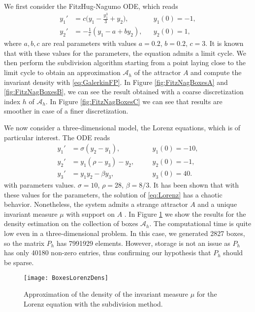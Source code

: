\documentclass{siamart1116}
\numberwithin{theorem}{section}
\begin{document}
We first consider the FitzHug-Nagumo ODE, which reads
\begin{equation}\label{eq:FitzNag}
\begin{aligned}
	y_1' &= c\Big(y_1 - \frac{y_1^3}{3} + y_2\Big), && y_1(0) = -1, \\
	y_2' &= -\frac{1}{c}(y_1 - a + by_2), && y_2(0) = 1,
\end{aligned}
\end{equation}
where $a, b, c$ are real parameters with values $a = 0.2$, $b = 0.2$, $c = 3$. It is known that with these values for the parameters, the equation admits a limit cycle. We then perform the subdivision algorithm starting from a point laying close to the limit cycle to obtain an approximation $\mathcal{A}_h$ of the attractor $A$ and compute the invariant density with \eqref{eq:GalerkinFP}. In Figure \ref{fig:FitzNagBoxesA} and \ref{fig:FitzNagBoxesB}, we can see the result obtained with a coarse discretization index $h$ of $\mathcal{A}_h$. In Figure \ref{fig:FitzNagBoxesC} we can see that results are smoother in case of a finer discretization. 

We now consider a three-dimensional model, the Lorenz equations, which is of particular interest. The ODE reads
\begin{equation}\label{eq:Lorenz}
\begin{aligned}
	y_1' &= \sigma(y_2 - y_1), \quad &&y_1(0) = -10,\\
	y_2' &= y_1(\rho - y_3) - y_2, \quad &&y_2(0) = -1,\\
	y_3' &= y_1y_2 - \beta y_3, \quad &&y_3(0) = 40.
\end{aligned}
\end{equation}
with parameters values. $\sigma = 10$, $\rho = 28$, $\beta = 8/3$. It has been shown \cite{LOR63} that with these values for the parameters, the solution of \eqref{eq:Lorenz} has a chaotic behavior. Nonetheless, the system admits a strange attractor $A$ and a unique invariant measure $\mu$ with support on $A$ \cite{Tuc99, HoM07}. In Figure \ref{fig:LorenzBoxes} we show the results for the density estimation on the collection of boxes $\mathcal{A}_h$. The computational time is quite low even in a three-dimensional problem. In this case, we generated 2827 boxes, so the matrix $P_h$ has 7991929 elements. However, storage is not an issue as $P_h$ has only 40180 non-zero entries, thus confirming our hypothesis that $P_h$ should be sparse.

\begin{figure}[t]
	\begin{center} 
		\texttt{[image: BoxesLorenzDens]}
	\end{center}
	\caption{Approximation of the density of the invariant measure $\mu$ for the Lorenz equation with the subdivision method.}
	\label{fig:LorenzBoxes}
\end{figure}
\end{document}
